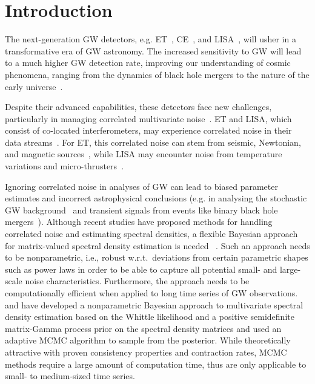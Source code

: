 \documentclass[%
 reprint,
 amsmath,amssymb,
 aps,
 nofootinbib,
]{revtex4-2}
\begin{document}
\section{Introduction}

The next-generation \ac{GW} detectors, e.g. \ac{ET}~\cite{Punturo_2010}, \ac{CE}~\cite{CE_horizon_study}, and \ac{LISA}~\cite{LISA_science_case}, will usher in a transformative era of \ac{GW} astronomy. 
The increased sensitivity to \ac{GW} will lead to a much higher \ac{GW} detection rate, improving our understanding of cosmic phenomena, ranging from the dynamics of black hole mergers to the nature of the early universe~\cite{ET_science_case, Maggiore_2020_ET_science_case, Branchesi_2023_ET_science_case, CE_horizon_study, LISA_science_case}.

Despite their advanced capabilities, these detectors face new challenges, particularly in managing correlated multivariate noise~\cite{ET_design_report,LISA_design_report}.
\ac{ET} and \ac{LISA}, which consist of co-located interferometers, may experience correlated noise in their data streams~\cite{Janssens2023}. 
For \ac{ET}, this correlated noise can stem from seismic, Newtonian, and magnetic sources~\cite{Ball_lightning_strokes, Janssens_newtonian_seismic, Janssens_magnetic_noise}, while \ac{LISA}  may encounter noise from temperature variations and micro-thrusters~\cite{lisa_temp_noise,lisa_thrusters_noise}. 

Ignoring correlated noise in analyses of \ac{GW} can lead to biased parameter estimates and incorrect astrophysical conclusions (e.g. in analysing the stochastic \ac{GW} background~\cite{Thrane_correlations_SGWB, Christensen_2019_SGWB, boileau2022figures} and transient signals from events like binary black hole mergers~\cite{Cireddu:2023:arXiv}). 
Although recent studies have proposed methods for handling correlated noise and estimating spectral densities, a flexible Bayesian approach for matrix-valued spectral density estimation is needed~\cite{Cireddu:2023:arXiv,JanssensKamiel2023Ffps} . 
Such an approach needs to be nonparametric, i.e., robust w.r.t.\ deviations from certain parametric shapes such as power laws in order to be able to capture all potential small- and large-scale noise characteristics.
Furthermore, the approach needs to be computationally efficient when applied to long time series of \ac{GW} observations. 
\citet{MeierAlexander2020Bnao} and \citet{Liu2023} have developed a nonparametric Bayesian approach to multivariate spectral density estimation based on the Whittle likelihood and a positive semidefinite matrix-Gamma process prior on the spectral density matrices and used an adaptive MCMC algorithm to sample from the posterior. 
While theoretically attractive with proven consistency properties and contraction rates, MCMC methods require a large amount of computation time, thus are only applicable to small- to medium-sized time series. 
\end{document}
